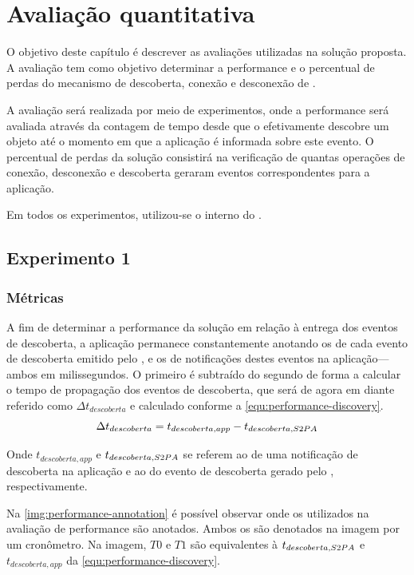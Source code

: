 \chapter{Avaliação quantitativa}\label{chap:avaliacao}

O objetivo deste capítulo é descrever as avaliações utilizadas na solução proposta. A avaliação tem como objetivo determinar a performance e o percentual de perdas do mecanismo de descoberta, conexão e desconexão de \smartobjs.

A avaliação será realizada por meio de experimentos, onde a performance será avaliada através da contagem de tempo desde que o \mhub efetivamente descobre um objeto até o momento em que a aplicação é informada sobre este evento. O percentual de perdas da solução consistirá na verificação de quantas operações de conexão, desconexão e descoberta geraram eventos correspondentes para a aplicação.

Em todos os experimentos, utilizou-se o \ubroker interno do \mhubcddl.

\section{Experimento 1}\label{chap:avaliacao-experimento1}


\subsection{Métricas}

A fim de determinar a performance da solução em relação à entrega dos eventos de descoberta, a aplicação permanece constantemente anotando os \timestamps de cada evento de descoberta emitido pelo \stwopa, e os \timestamps de notificações destes eventos na aplicação---ambos em milissegundos. O primeiro \timestamp é subtraído do segundo de forma a calcular o tempo de propagação dos eventos de descoberta, que será de agora em diante referido como $\Delta t_{descoberta}$ e calculado conforme a \autoref{equ:performance-discovery}.
\begin{equation}
	\label{equ:performance-discovery}
	\Delta t_{descoberta} = t_{descoberta,app} - t_{descoberta,S2PA}
\end{equation}

Onde $t_{descoberta,app}$ e $t_{descoberta,S2PA}$ se referem ao \timestamp de uma notificação de descoberta na aplicação e ao \timestamp do evento de descoberta gerado pelo \stwopa, respectivamente.

Na \autoref{img:performance-annotation} é possível observar onde os \timestamps utilizados na avaliação de performance são anotados. Ambos os \timestamps são denotados na imagem por um cronômetro. Na imagem, $T0$ e $T1$ são equivalentes à $t_{descoberta,S2PA}$ e $t_{descoberta,app}$ da \autoref{equ:performance-discovery}.

